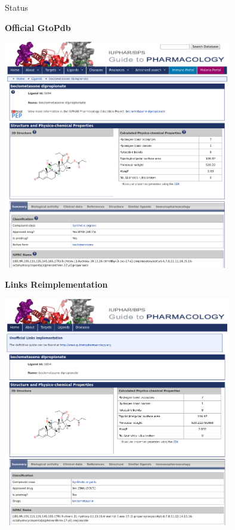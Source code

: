\documentclass[11.5pt, aspectratio=169]{beamer}
\begin{document}
\begin{frame}{Status}

  \begin{minipage}{0.45\textwidth}
    \begin{center}
      \small
      \textbf{Official GtoPdb}
    \end{center}
    \centering
    \includegraphics[width=0.75\textwidth]{images/screen-gtopdb-orig.png}
  \end{minipage}
  \hfill
  \begin{minipage}{0.45\textwidth}
    \begin{center}
      \small
      \textbf{Links Reimplementation}
    \end{center}

    \centering
    \includegraphics[width=0.75\textwidth]{images/screen-gtopdb-links.png}
  \end{minipage}


\end{frame}
\end{document}
